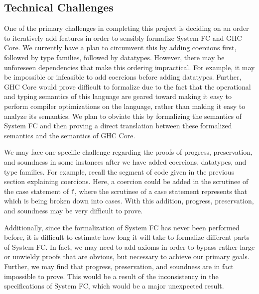 \documentclass{sig-alternate}
\begin{document}
\subsection{Technical Challenges}
\label{subsec:tech_challenges}
One of the primary challenges in completing this project is deciding on an order to iteratively add features in order to sensibly formalize System FC and GHC Core. We currently have a plan to circumvent this by adding coercions first, followed by type families, followed by datatypes. However, there may be unforeseen dependencies that make this ordering impractical. For example, it may be impossible or infeasible to add coercions before adding datatypes. Further, GHC Core would prove difficult to formalize due to the fact that the operational and typing semantics of this language are geared toward making it easy to perform compiler optimizations on the language, rather than making it easy to analyze its semantics. We plan to obviate this by formalizing the semantics of System FC and then proving a direct translation between these formalized semantics and the semantics of GHC Core.

We may face one specific challenge regarding the proofs of progress, preservation, and soundness in some instances after we have added coercions, datatypes, and type families. For example, recall the segment of code given in the previous section explaining coercions. Here, a coercion could be added in the scrutinee of the case statement of \texttt{f}, where the scrutinee of a case statement represents that which is being broken down into cases. With this addition, progress, preservation, and soundness may be very difficult to prove.

Additionally, since the formalization of System FC has never been performed before, it is difficult to estimate how long it will take to formalize different parts of System FC. In fact, we may need to add axioms in order to bypass rather large or unwieldy proofs that are obvious, but necessary to achieve our primary goals. Further, we may find that progress, preservation, and soundness are in fact impossible to prove. This would be a result of the inconsistency in the specifications of System FC, which would be a major unexpected result.
\end{document}

